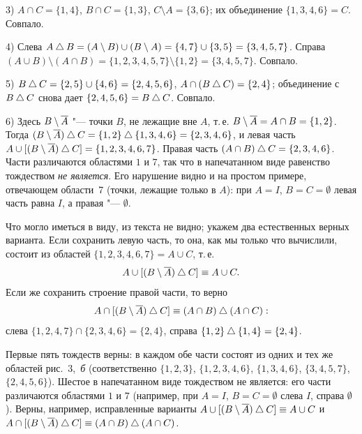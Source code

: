 \begin{solution}[1 (\S\,2)]
3) $A\cap C=\{1,4\}$, $B\cap C=\{1,3\}$, $C\setminus A=\{3,6\}$; их
объединение $\{1,3,4,6\}=C$. Совпало.

4) Слева $A\mathbin{\triangle} B=(A\setminus B)\cup(B\setminus A)=\{4,7\}\cup\{3,5\}=
\{3,4,5,7\}$. Справа $(A\cup B)\setminus(A\cap B)=\{1,2,3,4,5,7\}\setminus
\{1,2\}=\{3,4,5,7\}$. Совпало.

5) $B\mathbin{\triangle} C=\{2,5\}\cup\{4,6\}=\{2,4,5,6\}$, $A\cap(B\mathbin{\triangle} C)=\{2,4\}$;
объединение с $B\mathbin{\triangle} C$ снова дает $\{2,4,5,6\}=B\mathbin{\triangle} C$. Совпало.

6) Здесь $B\setminus\overline{A}$ "--- точки $B$, не лежащие вне $A$, т.\,е.
$B\setminus\overline{A}=A\cap B=\{1,2\}$. Тогда $(B\setminus\overline{A})\mathbin{\triangle} C=
\{1,2\}\mathbin{\triangle}\{1,3,4,6\}=\{2,3,4,6\}$, и левая часть
$A\cup[(B\setminus\overline{A})\mathbin{\triangle} C]=\{1,2,3,4,6,7\}$. Правая часть
$(A\cap B)\mathbin{\triangle} C=\{2,3,4,6\}$. Части различаются областями $1$ и $7$, так что
в напечатанном виде равенство тождеством \emph{не является}. Его
нарушение видно и на простом примере, отвечающем области~7 (точки,
лежащие только в $A$): при $A=I$, $B=C=\emptyset$ левая часть равна $I$,
а правая "--- $\emptyset$.

Что могло иметься в виду, из текста не видно; укажем два естественных
верных варианта. Если сохранить левую часть, то она, как мы только что
вычислили, состоит из областей $\{1,2,3,4,6,7\}=A\cup C$, т.\,е.
\[
A\cup[(B\setminus\overline{A})\mathbin{\triangle} C]\equiv A\cup C .
\]
Если же сохранить строение правой части, то верно
\[
A\cap[(B\setminus\overline{A})\mathbin{\triangle} C]\equiv(A\cap B)\mathbin{\triangle}(A\cap C):
\]
слева $\{1,2,4,7\}\cap\{2,3,4,6\}=\{2,4\}$, справа
$\{1,2\}\mathbin{\triangle}\{1,4\}=\{2,4\}$.

\answer Первые пять тождеств верны: в каждом обе части состоят из одних
и тех же областей рис.~3,~\emph{б} (соответственно $\{1,2,3\}$,
$\{1,2,3,4,6\}$, $\{1,3,4,6\}$, $\{3,4,5,7\}$, $\{2,4,5,6\}$). Шестое
в напечатанном виде тождеством не является: его части различаются
областями $1$ и $7$ (например, при $A=I$, $B=C=\emptyset$ слева $I$,
справа $\emptyset$). Верны, например, исправленные варианты
$A\cup[(B\setminus\overline{A})\mathbin{\triangle} C]\equiv A\cup C$ и
$A\cap[(B\setminus\overline{A})\mathbin{\triangle} C]\equiv(A\cap B)\mathbin{\triangle}(A\cap C)$.
\end{solution}

